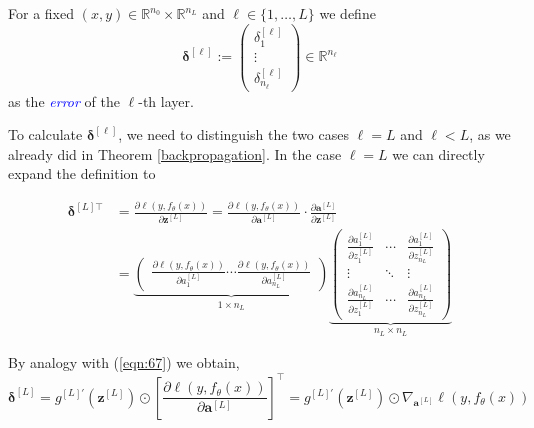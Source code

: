 \begin{definition}[Error]
For a fixed $(x, y) \in \mathbb{R}^{n_0} \times \mathbb{R}^{n_L}$ and $\ell \in \{1, \ldots, L\}$ we define
\begin{equation}
    \boldsymbol{\delta}^{[\ell]} := \begin{pmatrix}
        \delta_1^{[\ell]} \\ \vdots \\ \delta_{n_{\ell}}^{[\ell]}
    \end{pmatrix} \in \mathbb{R}^{n_{\ell}}
    \label{eqn:68}
\end{equation}
as the \textcolor{blue}{\emph{error}} of the $\ell$-th layer.
\end{definition}

To calculate $\boldsymbol{\delta}^{[\ell]}$, we need to distinguish the two cases $\ell = L$ and $\ell < L$, as we already did in Theorem \ref{backpropagation}. In the case $\ell = L$ we can directly expand the definition to

\begin{equation}
    \begin{aligned}
    \boldsymbol{\delta}^{[L]\top} &= \frac{\partial \ell(y, f_\theta(x))}{\partial \boldsymbol{z}^{[L]}} = \frac{\partial \ell(y, f_\theta(x))}{\partial \boldsymbol{a}^{[L]}} \cdot \frac{\partial \boldsymbol{a}^{[L]}}{\partial \boldsymbol{z}^{[L]}}\\
    &= \underbrace{\begin{pmatrix}
        \frac{\partial \ell(y, f_\theta(x))}{\partial a_1^{[L]}} \cdots \frac{\partial \ell(y, f_\theta(x))}{\partial a_{n_L}^{[L]}}
    \end{pmatrix}}_{1 \times n_L} \underbrace{\begin{pmatrix}
        \frac{\partial a_1^{[L]}}{\partial z_1^{[L]}} & \cdots & \frac{\partial a_1^{[L]}}{\partial z_{n_L}^{[L]}}\\
        \vdots & \ddots & \vdots\\
        \frac{\partial a_{n_L}^{[L]}}{\partial z_1^{[L]}} & \cdots & \frac{\partial a_{n_L}^{[L]}}{\partial z_{n_L}^{[L]}}
    \end{pmatrix}}_{n_L \times n_L}
    \end{aligned}
    \label{eqn:69}
\end{equation}

By analogy with (\ref{eqn:67}) we obtain,
\begin{equation}
    \boldsymbol{\delta}^{[L]} = g^{[L]'} \left( \boldsymbol{z}^{[L]} \right) \odot \left[ \frac{\partial \ell (y, f_\theta(x))}{\partial \boldsymbol{a}^{[L]}}  \right]^\top = g^{[L]'} \left( \boldsymbol{z}^{[L]} \right) \odot \nabla_{\boldsymbol{a}^{[L]}} \ell(y, f_\theta(x))
    \label{eqn:70}
\end{equation}

